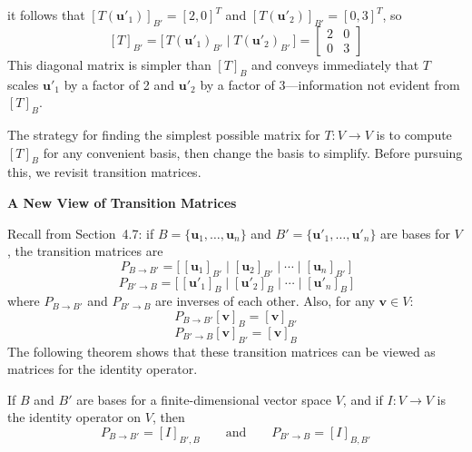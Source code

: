 \documentclass{article}
\newcommand{\redheading}[1]{{\vspace{2mm}\noindent\Large\bfseries\color{red!55!black} #1\par}\vspace{2mm}}
\begin{document}
it follows that $[T(\mathbf{u}'_1)]_{B'} = [2,0]^T$ and $[T(\mathbf{u}'_2)]_{B'} = [0,3]^T$, so
\[
  [T]_{B'} = \bigl[\,T(\mathbf{u}'_1)_{B'}\mid T(\mathbf{u}'_2)_{B'}\,\bigr]
  = \begin{bmatrix}2&0\\0&3\end{bmatrix}
\]
This diagonal matrix is simpler than $[T]_B$ and conveys immediately that $T$ scales
$\mathbf{u}'_1$ by a factor of 2 and $\mathbf{u}'_2$ by a factor of 3---information
not evident from $[T]_B$.

The strategy for finding the simplest possible matrix for $T : V \to V$ is to compute
$[T]_B$ for any convenient basis, then change the basis to simplify. Before pursuing this,
we revisit transition matrices.

\vspace{2mm}
\redheading{A New View of Transition Matrices}

Recall from Section~4.7: if $B = \{\mathbf{u}_1, \ldots, \mathbf{u}_n\}$ and
$B' = \{\mathbf{u}'_1, \ldots, \mathbf{u}'_n\}$ are bases for $V$, the transition
matrices are
\begin{equation}
  P_{B\to B'} = \bigl[\,[\mathbf{u}_1]_{B'}\mid[\mathbf{u}_2]_{B'}\mid\cdots\mid
  [\mathbf{u}_n]_{B'}\,\bigr] \tag{3}
\end{equation}
\begin{equation}
  P_{B'\to B} = \bigl[\,[\mathbf{u}'_1]_B\mid[\mathbf{u}'_2]_B\mid\cdots\mid
  [\mathbf{u}'_n]_B\,\bigr] \tag{4}
\end{equation}
where $P_{B\to B'}$ and $P_{B'\to B}$ are inverses of each other. Also, for any
$\mathbf{v} \in V$:
\begin{equation}
  P_{B\to B'}[\mathbf{v}]_B = [\mathbf{v}]_{B'} \tag{5}
\end{equation}
\begin{equation}
  P_{B'\to B}[\mathbf{v}]_{B'} = [\mathbf{v}]_B \tag{6}
\end{equation}
The following theorem shows that these transition matrices can be viewed as matrices for
the identity operator.

\begin{tcolorbox}[colback=red!4, colframe=red!60!black,
  title={\textbf{Theorem 8.5.1}}, boxrule=0.5mm, arc=3mm]
If $B$ and $B'$ are bases for a finite-dimensional vector space $V$, and if $I : V \to V$
is the identity operator on $V$, then
\[
  P_{B\to B'} = [I]_{B',B} \qquad\text{and}\qquad P_{B'\to B} = [I]_{B,B'}
\]
\end{tcolorbox}
\end{document}
